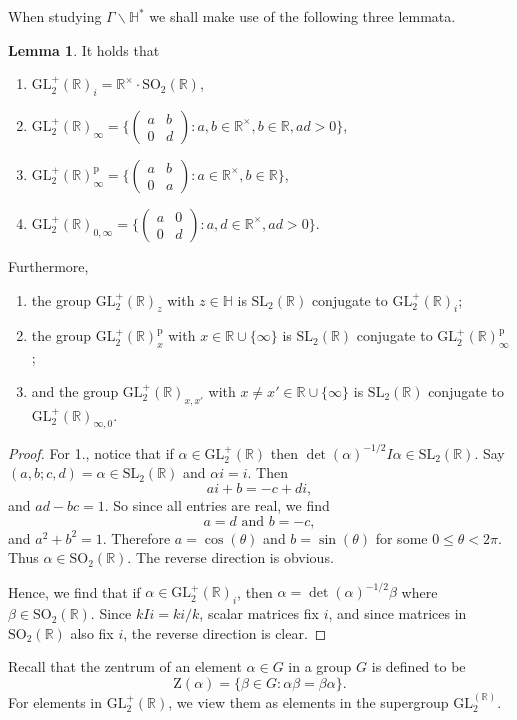 \documentclass{article}
\theoremstyle{definition}
\newtheorem{lem}{Lemma}
\begin{document}
When studying $\Gamma\backslash\mathbb{H}^\ast$ we shall make use of the following three lemmata.
\begin{lem}
	It holds that
	\begin{enumerate}
		\item $\mathrm{GL}_2^+(\mathbb{R})_i=\mathbb{R}^\times\cdot\mathrm{SO}_2(\mathbb{R})$,
		\item $\mathrm{GL}_2^+(\mathbb{R})_\infty=\Big\{\begin{pmatrix}a&b\\0&d\end{pmatrix}:a,b\in\mathbb{R}^\times,b\in\mathbb{R},ad>0\Big\}$,
		\item $\mathrm{GL}_2^+(\mathbb{R})_\infty^\mathrm{p}=\Big\{\begin{pmatrix}a&b\\0&a\end{pmatrix}:a\in\mathbb{R}^\times,b\in\mathbb{R}\Big\}$,
		\item $\mathrm{GL}_2^+(\mathbb{R})_{0,\infty}=\Big\{\begin{pmatrix}a&0\\0&d\end{pmatrix}:a,d\in\mathbb{R}^\times,ad>0\Big\}$.
	\end{enumerate}
	Furthermore,
	\begin{enumerate}
		\item the group $\mathrm{GL}_2^+(\mathbb{R})_z$ with $z\in\mathbb{H}$ is $\mathrm{SL}_2(\mathbb{R})$ conjugate to $\mathrm{GL}_2^+(\mathbb{R})_i$;
		\item the group $\mathrm{GL}_2^+(\mathbb{R})_x^\mathrm{p}$ with $x\in\mathbb{R}\cup\{\infty\}$ is $\mathrm{SL}_2(\mathbb{R})$ conjugate to $\mathrm{GL}_2^+(\mathbb{R})_\infty^\mathrm{p}$;
		\item and the group $\mathrm{GL}_2^+(\mathbb{R})_{x,x'}$ with $x\neq x'\in\mathbb{R}\cup\{\infty\}$ is $\mathrm{SL}_2(\mathbb{R})$ conjugate to $\mathrm{GL}_2^+(\mathbb{R})_{\infty,0}$.
	\end{enumerate}
\end{lem}
\begin{proof}
	For 1., notice that if $\alpha\in\mathrm{GL}_2^+(\mathbb{R})$ then $\det(\alpha)^{-1/2}I\alpha\in\mathrm{SL}_2(\mathbb{R})$. Say $(a,b;c,d)=\alpha\in\mathrm{SL}_2(\mathbb{R})$ and $\alpha i=i$. Then
	\[ai+b=-c+di,\]
	and $ad-bc=1$. So since all entries are real, we find
	\[a=d\text{ and }b=-c,\]
	and $a^2+b^2=1$. Therefore $a=\cos(\theta)$ and $b=\sin(\theta)$ for some $0\leq\theta<2\pi$. Thus $\alpha\in\mathrm{SO}_2(\mathbb{R})$. The reverse direction is obvious.

	Hence, we find that if $\alpha\in\mathrm{GL}_2^+(\mathbb{R})_i$, then $\alpha=\det(\alpha)^{-1/2}\beta$ where $\beta\in\mathrm{SO}_2(\mathbb{R})$. Since $kIi=ki/k$, scalar matrices fix $i$, and since matrices in $\mathrm{SO}_2(\mathbb{R})$ also fix $i$, the reverse direction is clear.
\end{proof}
Recall that the zentrum of an element $\alpha\in G$ in a group $G$ is defined to be
\[\mathrm{Z}(\alpha)=\{\beta\in G:\alpha\beta=\beta\alpha\}.\]
For elements in $\mathrm{GL}_2^+(\mathbb{R})$, we view them as elements in the supergroup $\mathrm{GL}_2^(\mathbb{R})$.
\end{document}
